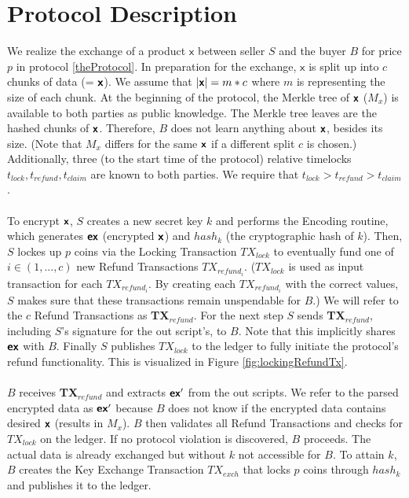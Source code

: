 \documentclass{cacthesis}
\newcounter{protocol}
\begin{document}
        \section{Protocol Description}
        We realize the exchange of a product $\textsf{x}$ between seller $S$ and the buyer $B$ for price $p$ in protocol \ref{theProtocol}. In preparation for the exchange, $\textsf{x}$ is split up into $c$ chunks of data (= $\textsf{\textbf{x}}$). We assume that $|\textsf{\textbf{x}}| = m*c $ where $m$ is representing the size of each chunk. At the beginning of the protocol, the Merkle tree of $\textsf{\textbf{x}}$ ($M_x$) is available to both parties as public knowledge. The Merkle tree leaves are the hashed chunks of $\textsf{\textbf{x}}$. Therefore, $B$ does not learn anything about $\textsf{\textbf{x}}$, besides its size. (Note that $M_x$ differs for the same $\textsf{\textbf{x}}$ if a different split $c$ is chosen.) Additionally, three (to the start time of the protocol) relative timelocks $t_{lock}, t_{refund}, t_{claim}$ are known to both parties. We require that $t_{lock} > t_{refund} > t_{claim}$. \\\\
        To encrypt $\textsf{\textbf{x}}$, $S$ creates a new secret key $k$ and performs the \textsf{Encoding} routine, which generates $\textsf{\textbf{ex}}$ (encrypted $\textsf{\textbf{x}}$) and $hash_k$ (the cryptographic hash of $k$). Then, $S$ lockes up $p$ coins via the Locking Transaction $TX_{lock}$ to eventually fund one of $i \in (1, ..., c)$ new Refund Transactions $TX_{{refund}_i}$. ($TX_{lock}$  is used as input transaction for each $TX_{{refund}_i}$. By creating each $TX_{{refund}_i}$ with the correct values, $S$ makes sure that these transactions remain unspendable for $B$.) We will refer to the $c$ Refund Transactions as \textbf{TX$_{{refund}}$}. For the next step $S$ sends \textbf{TX$_{{refund}}$}, including $S$'s signature for the out script's, to $B$. Note that this implicitly shares $\textsf{\textbf{ex}}$ with $B$. Finally $S$ publishes $TX_{lock}$ to the ledger to fully initiate the protocol's refund functionality. This is visualized in Figure \ref{fig:lockingRefundTx}. \\\\
        $B$ receives \textbf{TX$_{{refund}}$} and extracts $\textsf{\textbf{ex}}'$ from the out scripts. We refer to the parsed encrypted data as $\textsf{\textbf{ex}}'$ because $B$ does not know if the encrypted data contains desired $\textsf{\textbf{x}}$ (results in $M_x$). $B$ then validates all Refund Transactions and checks for $TX_{lock}$ on the ledger. If no protocol violation is discovered, $B$ proceeds. The actual data is already exchanged but without $k$ not accessible for $B$. To attain $k$, $B$ creates the Key Exchange Transaction $TX_{exch}$ that locks $p$ coins through $hash_k$ and publishes it to the ledger. \\\\
\end{document}
